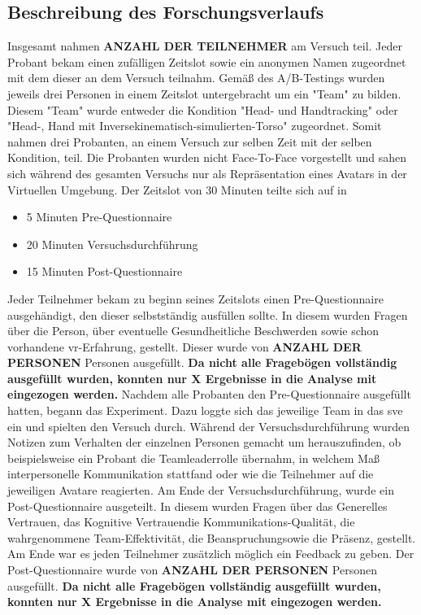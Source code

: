 \documentclass[a4paper,11pt]{article}%
\renewcommand{\\}{\vspace*{0.5\baselineskip} \newline}
\begin{document}
		\subsection{Beschreibung des Forschungsverlaufs}
		Insgesamt nahmen \textbf{ANZAHL DER TEILNEHMER} am Versuch teil.
Jeder Probant bekam einen zufälligen Zeitslot sowie ein anonymen Namen zugeordnet mit dem dieser an dem Versuch teilnahm. Gemäß des A/B-Testings wurden jeweils drei Personen in einem Zeitslot untergebracht um ein "Team" zu bilden. Diesem "Team" wurde entweder die Kondition "Head- und Handtracking" oder "Head-, Hand mit Inversekinematisch-simulierten-Torso" zugeordnet. Somit nahmen drei Probanten, an einem Versuch zur selben Zeit mit der selben Kondition, teil. Die Probanten wurden nicht Face-To-Face vorgestellt und sahen sich während des gesamten Versuchs nur als Repräsentation eines Avatars in der Virtuellen Umgebung. Der Zeitslot von 30 Minuten teilte sich auf in
		\begin{itemize}
			\item 5 Minuten Pre-Questionnaire
			\item 20 Minuten Versuchsdurchführung
			\item 15 Minuten Post-Questionnaire
		\end{itemize}
		Jeder Teilnehmer bekam zu beginn seines Zeitslots einen Pre-Questionnaire ausgehändigt, den dieser selbstständig ausfüllen sollte. In diesem wurden Fragen über die \flqq Person\frqq, über eventuelle \flqq Gesundheitliche Beschwerden \frqq sowie schon vorhandene \flqq \ac{vr}-Erfahrung\frqq, gestellt.
		Dieser wurde von \textbf{ANZAHL DER PERSONEN} Personen ausgefüllt. \textbf{Da nicht alle Fragebögen vollständig ausgefüllt wurden, konnten nur X Ergebnisse in die Analyse mit eingezogen werden.}
		Nachdem alle Probanten den Pre-Questionnaire ausgefüllt hatten, begann das Experiment. Dazu loggte sich das jeweilige Team in das \ac{sve} ein und spielten den Versuch durch.
		Während der Versuchsdurchführung wurden Notizen zum Verhalten der einzelnen Personen gemacht um herauszufinden, ob beispielsweise ein Probant die Teamleaderrolle übernahm, in welchem Maß interpersonelle Kommunikation stattfand oder wie die Teilnehmer auf die jeweiligen Avatare reagierten.
		Am Ende der Versuchsdurchführung, wurde ein Post-Questionnaire ausgeteilt. In diesem wurden Fragen über das \flqq Generelles Vertrauen\frqq, das \flqq Kognitive Vertrauen\frqq die \flqq Kommunikations-Qualität\frqq, die wahrgenommene \flqq Team-Effektivität\frqq, die \flqq Beanspruchung\frqq sowie die \flqq Präsenz\frqq, gestellt. Am Ende war es jeden Teilnehmer zusätzlich möglich ein Feedback zu geben. Der Post-Questionnaire wurde von \textbf{ANZAHL DER PERSONEN} Personen ausgefüllt. \textbf{Da nicht alle Fragebögen vollständig ausgefüllt wurden, konnten nur X Ergebnisse in die Analyse mit eingezogen werden.}
		
\end{document}
